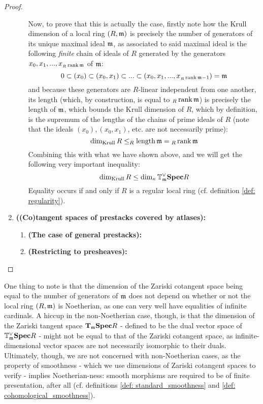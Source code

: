\begin{proof}
\begin{enumerate}
\begin{enumerate}
                                Now, to prove that this is actually the case, firstly note how the Krull dimension of a local ring $(R, \mathfrak{m})$ is precisely the number of generators of its unique maximal ideal $\mathfrak{m}$, as associated to said maximal ideal is the following \textit{finite} chain of ideals of $R$ generated by the generators $x_0, x_1, ..., x_{{}_R\operatorname{rank} \mathfrak{m}}$ of $\mathfrak{m}$:
                                    $$0 \subset (x_0) \subset (x_0, x_1) \subset ... \subset (x_0, x_1, ..., x_{{}_R\operatorname{rank} \mathfrak{m} - 1}) = \mathfrak{m}$$
                                and because these generators are $R$-linear independent from one another, its length (which, by construction, is equal to ${}_R\operatorname{rank} \mathfrak{m}$) is precisely the length of $\mathfrak{m}$, which bounds the Krull dimension of $R$, which by definition, is the supremum of the lengths of the chains of prime ideals of $R$ (note that the ideals $(x_0), (x_0, x_1)$, etc. are not necessarily prime):
                                    $$\dim_{\mathrm{Krull}} R \leq _R\operatorname{length} \mathfrak{m} = {}_R\operatorname{rank} \mathfrak{m}$$
                                Combining this with what we have shown above, and we will get the following very important inequality:
                                    $$\dim_{\mathrm{Krull}} R \leq \dim_{\kappa} \mathbb{T}^{\vee}_{\mathfrak{m}} \mathbf{Spec} R$$
                                Equality occurs if and only if $R$ is a regular local ring (cf. definition \ref{def: regularity}).
                            \end{enumerate}
                        \item \textbf{\textbf{((Co)tangent spaces of prestacks covered by atlases):}} 
                            \begin{enumerate}
                                \item \textbf{(The case of general prestacks):}
                                \item \textbf{(Restricting to presheaves):}
                            \end{enumerate}
                    \end{enumerate}
                \end{proof}
            \begin{remark}
                One thing to note is that the dimension of the Zariski cotangent space being equal to the number of generators of $\mathfrak{m}$ does not depend on whether or not the local ring $(R, \mathfrak{m})$ is Noetherian, as one can very well have equalities of infinite cardinals. A hiccup in the non-Noetherian case, though, is that the dimension of the Zariski tangent space $\mathbf{T}_{\mathfrak{m}}\mathbf{Spec} R$ - defined to be the dual vector space of $\mathbb{T}^{\vee}_{\mathfrak{m}}\mathbf{Spec} R$ - might not be equal to that of the Zariski cotangent space, as infinite-dimensional vector spaces are not necessarily isomorphic to their duals. Ultimately, though, we are not concerned with non-Noetherian cases, as the property of smoothness - which we use dimensions of Zariski cotangent spaces to verify - implies Noetherian-ness: smooth morphisms are required to be of finite presentation, after all (cf. definitions \ref{def: standard_smoothness} and \ref{def: cohomological_smoothness}).
            \end{remark}
                
